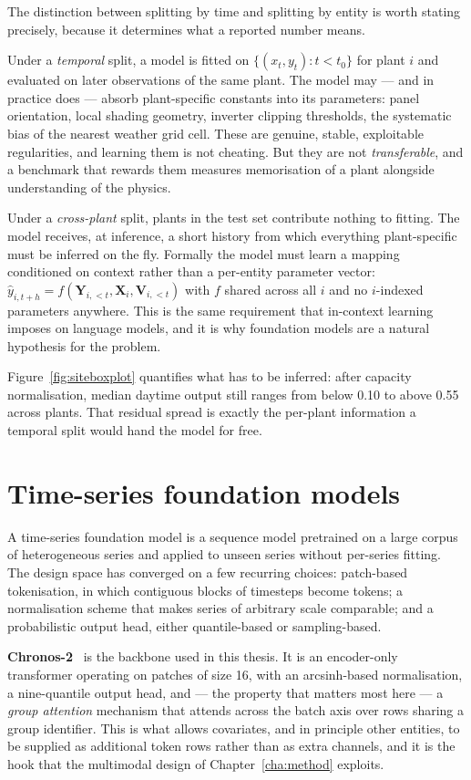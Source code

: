 The distinction between splitting by time and splitting by entity is worth stating precisely,
because it determines what a reported number means.

Under a \emph{temporal} split, a model is fitted on $\{(x_t, y_t) : t < t_0\}$ for plant $i$
and evaluated on later observations of the same plant. The model may --- and in practice
does --- absorb plant-specific constants into its parameters: panel orientation, local
shading geometry, inverter clipping thresholds, the systematic bias of the nearest weather
grid cell. These are genuine, stable, exploitable regularities, and learning them is not
cheating. But they are not \emph{transferable}, and a benchmark that rewards them measures
memorisation of a plant alongside understanding of the physics.

Under a \emph{cross-plant} split, plants in the test set contribute nothing to fitting. The
model receives, at inference, a short history from which everything plant-specific must be
inferred on the fly. Formally the model must learn a mapping conditioned on context rather
than a per-entity parameter vector: $\hat{y}_{i,t+h} = f(\mathbf{Y}_{i,<t},
\mathbf{X}_{i}, \mathbf{V}_{i,<t})$ with $f$ shared across all $i$ and no $i$-indexed
parameters anywhere. This is the same requirement that in-context learning imposes on
language models, and it is why foundation models are a natural hypothesis for the problem.

Figure~\ref{fig:siteboxplot} quantifies what has to be inferred: after capacity
normalisation, median daytime output still ranges from below 0.10 to above 0.55 across
plants. That residual spread is exactly the per-plant information a temporal split would hand
the model for free.

\section{Time-series foundation models}
\label{sec:tsfm}

A time-series foundation model is a sequence model pretrained on a large corpus of
heterogeneous series and applied to unseen series without per-series fitting. The design
space has converged on a few recurring choices: patch-based tokenisation, in which
contiguous blocks of timesteps become tokens; a normalisation scheme that makes series of
arbitrary scale comparable; and a probabilistic output head, either quantile-based or
sampling-based.

\textbf{Chronos-2}~\cite{chronos2} is the backbone used in this thesis. It is an
encoder-only transformer operating on patches of size 16, with an arcsinh-based
normalisation, a nine-quantile output head, and --- the property that matters most here ---
a \emph{group attention} mechanism that attends across the batch axis over rows sharing a
group identifier. This is what allows covariates, and in principle other entities, to be
supplied as additional token rows rather than as extra channels, and it is the hook that
the multimodal design of Chapter~\ref{cha:method} exploits.

